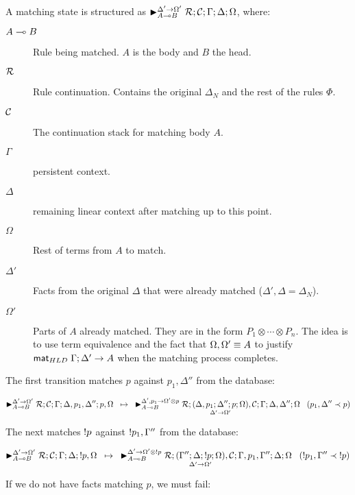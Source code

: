 A matching state is structured as $\matstate{A \lolli
   B}{\rulestk}{\lstack{C}}{\Gamma}{\Delta}{\Omega}{\Delta' \rightarrow
      \Omega'}$, where:

\begin{description}
   \item[$A \lolli B$] Rule being matched. $A$ is the body and $B$ the head.
   \item[$\rulestk$] Rule continuation. Contains the original $\Delta_N$ and the
   rest of the rules $\Phi$.
   \item[$\lstack{C}$] The continuation stack for matching body $A$.
   \item[$\Gamma$] persistent context.
   \item[$\Delta$] remaining linear context after matching up to this point.
   \item[$\Omega$] Rest of terms from $A$ to match.
   \item[$\Delta'$] Facts from the original $\Delta$ that were already matched
      ($\Delta', \Delta = \Delta_N$).
   \item[$\Omega'$] Parts of $A$ already matched. They are in the form $P_1
      \otimes \dotsb \otimes P_n$. The idea is to use term equivalence and the
      fact that $\feq{\Omega, \Omega'}{A}$ to justify $\mz \Gamma; \Delta'
      \rightarrow A$ when the matching process completes.
\end{description}

The first transition matches $p$ against $p_1, \Delta''$ from the database:

\[
\trans{\matstate{A \lolli B}{\rulestk}{\lstack{C}}{\Gamma}{\Delta, p_1, \Delta''}{p,
   \Omega}{\Delta' \rightarrow \Omega'}}
{\matstate{A \lolli B}{\rulestk}{\lframe{\Delta,
   p_1}{\Delta''}{p}{\Omega}{\Delta'}{\Omega'}, \lstack{C}}{\Gamma}{\Delta,
   \Delta''}{\Omega}{\Delta', p_1 \rightarrow \Omega' \otimes p}} \;\;\; (p_1, \Delta'' \prec p)
\]

The next matches $\bang p$ against $\bang p_1, \Gamma''$ from the database:

\[
\trans{\matstate{A \lolli B}{\rulestk}{\lstack{C}}{\Gamma}{\Delta}{\bang p,
   \Omega}{\Delta' \rightarrow \Omega'}}
{\matstate{A \lolli B}{\rulestk}{\pframe{\Gamma''}{\Delta}{\bang
   p}{\Omega}{\Delta'}{\Omega'}, \lstack{C}}{\Gamma, p_1,
      \Gamma''}{\Delta}{\Omega}{\Delta' \rightarrow \Omega' \otimes \bang p}}
      \;\;\; (\bang p_1, \Gamma'' \prec \bang p)
\]

If we do not have facts matching $p$, we must fail:

